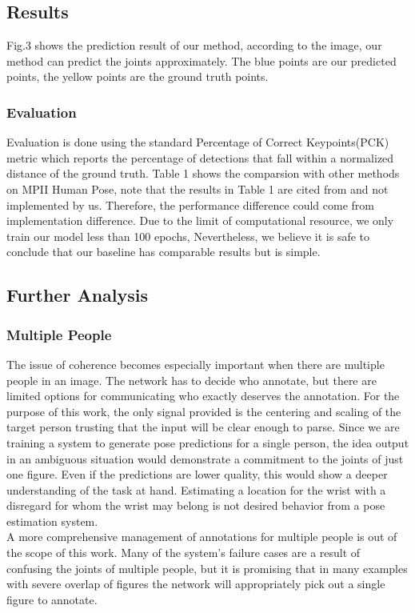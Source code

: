 \documentclass[final]{cvpr}
\begin{document}
\subsection{Results}
Fig.3 shows the prediction result of our method, according to the image, our method can predict the joints approximately. The blue points are our predicted points, the yellow points are the ground truth points.
\subsubsection{Evaluation}
Evaluation is done using the standard Percentage of Correct Keypoints(PCK) metric which reports the percentage of detections that fall within a normalized distance of the ground truth. Table 1 shows the  comparsion with other methods on MPII Human Pose, note that the results in Table 1 are cited from \cite{newell2016stacked} and not implemented by us. Therefore, the performance difference could come from implementation difference. Due to the limit of computational resource, we only train our model less than 100 epochs, Nevertheless, we believe it is safe to conclude that our baseline has comparable results but is simple.
\subsection{Further Analysis}
\subsubsection{Multiple People}
The issue of coherence becomes especially important when there are multiple people in an image. The network has to decide who annotate, but there are limited options for communicating who exactly deserves the annotation. For the purpose of this work, the only signal provided is the centering and scaling of the target person trusting that the input will be clear enough to parse. Since we are training a system to generate pose predictions for a single person, the idea output in an ambiguous situation would demonstrate a commitment to the joints of just one figure. Even if the predictions are lower quality, this would show a deeper understanding of the task at hand. Estimating a location for the wrist with a disregard for whom the wrist may belong is not desired behavior from a pose estimation system. \\
\indent A more comprehensive management of annotations for multiple people is out of the scope of this work. Many of the system’s failure cases are a result of confusing the joints of multiple people, but it is promising that in many examples with severe overlap of figures the network will appropriately pick out a single figure to annotate.
\end{document}
